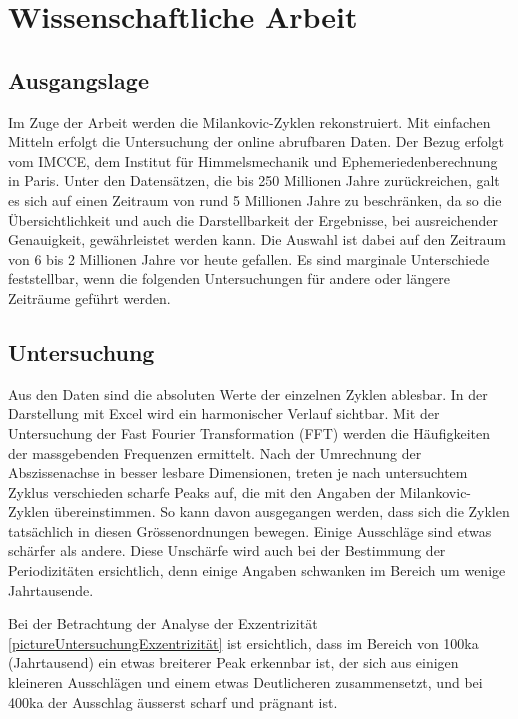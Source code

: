 %
%
%
%
\section{Wissenschaftliche Arbeit 
\label{milankovic:section:WissenschaftlicheArbeit}}

\subsection{Ausgangslage
\label{milankovic:subsection:Ausgangslage}}
Im Zuge der Arbeit werden die Milankovic-Zyklen rekonstruiert.
Mit einfachen Mitteln erfolgt die Untersuchung der online abrufbaren Daten.
Der Bezug erfolgt vom IMCCE, dem Institut für Himmelsmechanik und Ephemeriedenberechnung in Paris.
Unter den Datensätzen, die bis 250 Millionen Jahre zurückreichen, galt es sich auf einen Zeitraum von rund 5 Millionen Jahre zu beschränken, da so die Übersichtlichkeit und auch die Darstellbarkeit der Ergebnisse, bei ausreichender Genauigkeit, gewährleistet werden kann.
Die Auswahl ist dabei auf den Zeitraum von 6 bis 2 Millionen Jahre vor heute gefallen.
Es sind marginale Unterschiede feststellbar, wenn die folgenden Untersuchungen für andere oder längere Zeiträume geführt werden.

\subsection{Untersuchung
\label{milankovic:subsection:Untersuchung}}
Aus den Daten sind die absoluten Werte der einzelnen Zyklen ablesbar.
In der Darstellung mit Excel wird ein harmonischer Verlauf sichtbar.
Mit der Untersuchung der Fast Fourier Transformation (FFT) werden die Häufigkeiten der massgebenden Frequenzen ermittelt.
Nach der Umrechnung der Abszissenachse in besser lesbare Dimensionen, treten je nach untersuchtem Zyklus verschieden scharfe Peaks auf, die mit den Angaben der Milankovic-Zyklen übereinstimmen.
So kann davon ausgegangen werden, dass sich die Zyklen tatsächlich in diesen Grössenordnungen bewegen.
Einige Ausschläge sind etwas schärfer als andere.
Diese Unschärfe wird auch bei der Bestimmung der Periodizitäten ersichtlich, denn einige Angaben schwanken im Bereich um wenige Jahrtausende. 

Bei der Betrachtung der Analyse der Exzentrizität
\ref{pictureUntersuchungExzentrizität}
ist ersichtlich, dass im Bereich von 100ka (Jahrtausend) ein etwas breiterer Peak erkennbar ist, der sich aus einigen kleineren Ausschlägen und einem etwas Deutlicheren zusammensetzt, und bei 400ka der Ausschlag äusserst scharf und prägnant ist.

